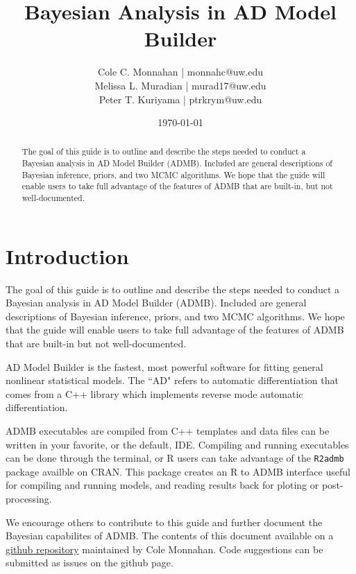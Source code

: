 \documentclass{article}\usepackage[]{graphicx}\usepackage[]{color}
\begin{document}
\title{Bayesian Analysis in AD Model Builder}
\author{Cole C. Monnahan | monnahc@uw.edu \\
Melissa L. Muradian | murad17@uw.edu \\
Peter T. Kuriyama | ptrkrym@uw.edu}

\date{\today{}}
\maketitle
\begin{abstract}
  The goal of this guide is to outline and describe the steps needed to conduct a Bayesian analysis in AD 
  Model Builder (ADMB). Included are general descriptions of Bayesian inference, priors, and two MCMC algorithms. We
  hope that the guide will enable users to take full advantage of the features of ADMB that are built-in,
  but not well-documented.
  
\end{abstract}

\tableofcontents

\section{Introduction}

  The goal of this guide is to outline and describe the steps needed to conduct a Bayesian analysis in AD 
  Model Builder (ADMB). Included are general descriptions of Bayesian inference, priors, and two MCMC algorithms. We
  hope that the guide will enable users to take full advantage of the features of ADMB that are built-in
  but not well-documented.

  AD Model Builder is the fastest, most powerful software for fitting general nonlinear statistical models.
  The ``AD" refers to automatic differentiation that comes from a C++ library which implements reverse mode 
  automatic differentiation. 
  
  ADMB executables are compiled from C++ templates and data files can be written in your favorite, or the 
  default, IDE. Compiling and running executables can be done through the terminal, or R users can take 
  advantage of the \texttt{R2admb} package availble on CRAN. This package creates an R to ADMB interface 
  useful for compiling and running models, and reading results back for ploting or post-processing.

  We encourage others to contribute to this guide and further document the Bayesian capabilites of ADMB.
  The contents of this document available on a \href{https://github.com/colemonnahan/admb_guide}{github
  repository} maintained by Cole Monnahan. Code suggestions can be submitted as issues on the github page.
  
\end{document}

